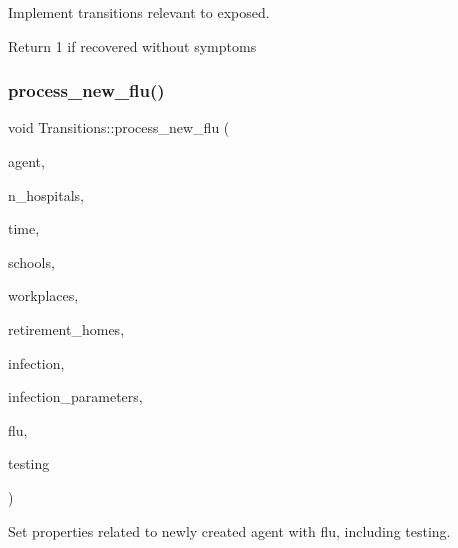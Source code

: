 Implement transitions relevant to exposed. 

Return 1 if recovered without symptoms \mbox{\label{classTransitions_a2482934e9144b870a1a97a4470015ed4}} 
\subsubsection{\texorpdfstring{process\+\_\+new\+\_\+flu()}{process\_new\_flu()}}
{\footnotesize\ttfamily void Transitions\+::process\+\_\+new\+\_\+flu (\begin{DoxyParamCaption}\item[{\hyperlink{classAgent}{Agent} \&}]{agent,  }\item[{const int}]{n\+\_\+hospitals,  }\item[{const double}]{time,  }\item[{std\+::vector$<$ \hyperlink{classSchool}{School} $>$ \&}]{schools,  }\item[{std\+::vector$<$ \hyperlink{classWorkplace}{Workplace} $>$ \&}]{workplaces,  }\item[{std\+::vector$<$ \hyperlink{classRetirementHome}{Retirement\+Home} $>$ \&}]{retirement\+\_\+homes,  }\item[{\hyperlink{classInfection}{Infection} \&}]{infection,  }\item[{const std\+::map$<$ std\+::string, double $>$ \&}]{infection\+\_\+parameters,  }\item[{\hyperlink{classFlu}{Flu} \&}]{flu,  }\item[{const \hyperlink{classTesting}{Testing} \&}]{testing }\end{DoxyParamCaption})\hspace{0.3cm}{\ttfamily [inline]}}



Set properties related to newly created agent with flu, including testing. 

\mbox{\label{classTransitions_a3c487bc7e6e586498bf3733ab372614a}} 
